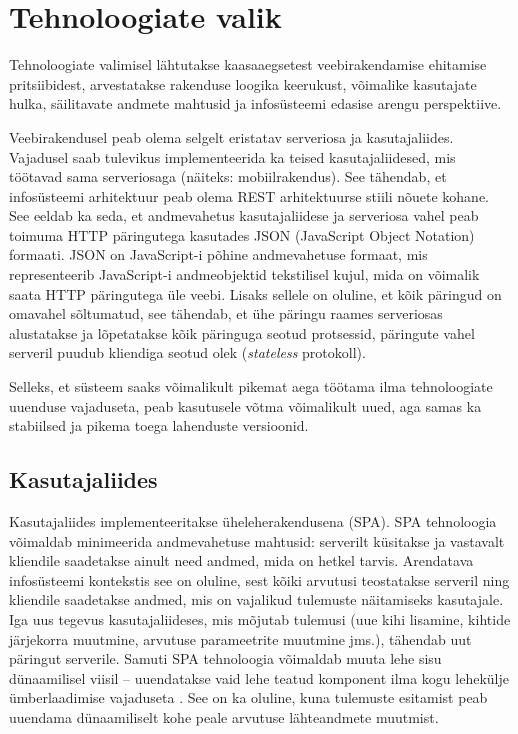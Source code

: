 \section{Tehnoloogiate valik}
Tehnoloogiate valimisel lähtutakse kaasaaegsetest veebirakendamise ehitamise pritsiibidest, arvestatakse
rakenduse loogika keerukust, võimalike kasutajate hulka, säilitavate andmete mahtusid ja infosüsteemi
edasise arengu perspektiive. 

Veebirakendusel peab olema selgelt eristatav serveriosa ja kasutajaliides. Vajadusel saab tulevikus 
implementeerida ka teised kasutajaliidesed, mis töötavad sama serveriosaga (näiteks: mobiilrakendus).
See tähendab, et infosüsteemi arhitektuur peab olema REST arhitektuurse stiili nõuete kohane. See eeldab
ka seda, et andmevahetus kasutajaliidese ja serveriosa vahel peab toimuma HTTP päringutega kasutades 
JSON (JavaScript Object Notation) formaati. JSON on JavaScript-i põhine andmevahetuse formaat, mis 
representeerib JavaScript-i andmeobjektid tekstilisel kujul, mida on võimalik saata HTTP 
päringutega üle veebi\cite{about_rest}.
Lisaks sellele on oluline, et kõik päringud on omavahel sõltumatud, see tähendab, et ühe 
päringu raames serveriosas alustatakse ja lõpetatakse kõik päringuga seotud protsessid, päringute 
vahel serveril puudub kliendiga seotud olek (\textit{stateless} protokoll)\cite{about_rest}.

Selleks, et süsteem saaks võimalikult pikemat aega töötama ilma tehnoloogiate uuenduse vajaduseta,
peab kasutusele võtma võimalikult uued, aga samas ka stabiilsed ja pikema toega lahenduste versioonid. 
 

\subsection{Kasutajaliides}
Kasutajaliides implementeeritakse üheleherakendusena (SPA). SPA tehnoloogia võimaldab minimeerida 
andmevahetuse mahtusid: serverilt küsitakse ja vastavalt kliendile saadetakse ainult need andmed, 
mida on hetkel tarvis. Arendatava infosüsteemi kontekstis see on oluline, sest kõiki arvutusi 
teostatakse serveril ning kliendile saadetakse andmed, mis on vajalikud tulemuste näitamiseks 
kasutajale. Iga uus tegevus kasutajaliideses, mis mõjutab tulemusi (uue kihi lisamine, 
kihtide järjekorra muutmine, arvutuse parameetrite muutmine jms.), tähendab uut päringut serverile. 
Samuti SPA tehnoloogia võimaldab muuta lehe sisu dünaamilisel viisil -- uuendatakse vaid lehe teatud
komponent ilma kogu lehekülje ümberlaadimise vajaduseta \cite{about_spa}. See on ka oluline, kuna tulemuste esitamist 
peab uuendama dünaamiliselt kohe peale arvutuse lähteandmete muutmist.

